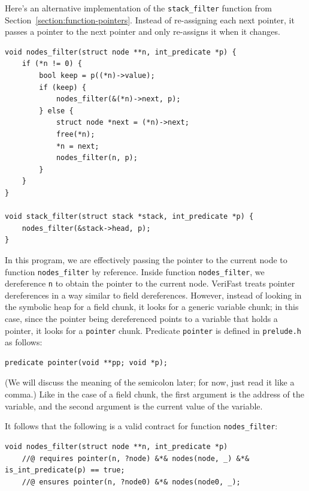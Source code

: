 \documentclass{article}
\begin{document}
Here's an alternative implementation of the
\lstinline!stack_filter! function from
Section~\ref{section:function-pointers}. Instead of
re-assigning each next pointer, it passes a pointer to the next
pointer and only re-assigns it when it changes.
\begin{lstlisting}
void nodes_filter(struct node **n, int_predicate *p) {
    if (*n != 0) {
        bool keep = p((*n)->value);
        if (keep) {
            nodes_filter(&(*n)->next, p);
        } else {
            struct node *next = (*n)->next;
            free(*n);
            *n = next;
            nodes_filter(n, p);
        }
    }
}

void stack_filter(struct stack *stack, int_predicate *p) {
    nodes_filter(&stack->head, p);
}
\end{lstlisting}
In this program, we are effectively passing the pointer to the
current node to function \lstinline!nodes_filter! by reference.
Inside function \lstinline!nodes_filter!, we dereference
\lstinline!n! to obtain the pointer to the current node.
VeriFast treats pointer dereferences in a way similar to field
dereferences. However, instead of looking in the symbolic heap
for a field chunk, it looks for a generic variable chunk; in
this case, since the pointer being dereferenced points to a
variable that holds a pointer, it looks for a
\lstinline!pointer! chunk. Predicate \lstinline!pointer! is
defined in \texttt{prelude.h} as follows:
\begin{lstlisting}
predicate pointer(void **pp; void *p);
\end{lstlisting}
(We will discuss the meaning of the semicolon later; for now,
just read it like a comma.) Like in the case of a field chunk,
the first argument is the address of the variable, and the
second argument is the current value of the variable.

It follows that the following is a valid contract for function
\lstinline!nodes_filter!:
\begin{lstlisting}
void nodes_filter(struct node **n, int_predicate *p)
    //@ requires pointer(n, ?node) &*& nodes(node, _) &*& is_int_predicate(p) == true;
    //@ ensures pointer(n, ?node0) &*& nodes(node0, _);
\end{lstlisting}
\end{document}
